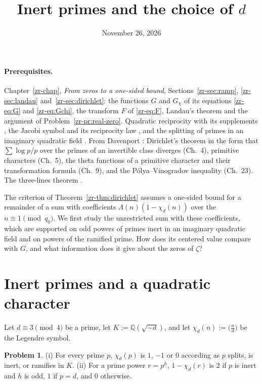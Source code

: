 \documentclass[reqno]{amsart}
\title{Inert primes and the choice of \(d\)}
\author{}
\date{November 26, 2026}
\newcounter{chap}
\theoremstyle{definition}
\newtheorem{problem}{Problem}[section]
\theoremstyle{plain}
\theoremstyle{remark}
\newcommand{\Q}{\mathbb{Q}}
\begin{document}
\maketitle
{}\label{chap}


\paragraph{Prerequisites.}
Chapter~\ref{zr-chap}, \emph{From zeros to a one-sided bound}, Sections~\ref{zr-sec:ramp}, \ref{zr-sec:landau} and~\ref{zr-sec:dirichlet}: the functions $G$ and $G_\chi$ of its equations \eqref{zr-eq:G} and \eqref{zr-eq:Gchi}, the transform $F$ of \eqref{zr-eq:F}, Landau's theorem and the argument of Problem~\ref{zr-pr:real-zero}.  Quadratic reciprocity with its supplements \cite[Ch.~I, \S3]{SeA}, the Jacobi symbol and its reciprocity law \cite[Ch.~5]{IR}, and the splitting of primes in an imaginary quadratic field \cite[Ch.~I, \S8]{Ne}.  From Davenport \cite{Dav}: Dirichlet's theorem in the form that $\sum \log p/p$ over the primes of an invertible class diverges (Ch.~4), primitive characters (Ch.~5), the theta functions of a primitive character and their transformation formula (Ch.~9), and the P\'olya--Vinogradov inequality (Ch.~23).  The three-lines theorem \cite[Ch.~12]{Ru}. %

\medskip
The criterion of Theorem~\ref{zr-thm:dirichlet} assumes a one-sided bound for a remainder of a sum with coefficients $\Lambda(n)(1 - \chi_d(n))$ over the $n \equiv 1 \pmod{q_0}$.  We first study the unrestricted sum with these coefficients, which are supported on odd powers of primes inert in an imaginary quadratic field and on powers of the ramified prime.  How does its centered value compare with $G$, and what information does it give about the zeros of $\zeta$?

\section{Inert primes and a quadratic character}\label{sec:inert}

Let $d \equiv 3 \pmod 4$ be a prime, let $K := \Q(\sqrt{-d})$, and let $\chi_d(n) := \bigl(\frac{n}{d}\bigr)$ be the Legendre symbol.

\begin{problem}\label{pr:kronecker}
(i) For every prime $p$, $\chi_d(p)$ is $1$, $-1$ or $0$ according as $p$ splits, is inert, or ramifies in $K$.
(ii) For a prime power $r = p^h$, $1 - \chi_d(r)$ is $2$ if $p$ is inert and $h$ is odd, $1$ if $p = d$, and $0$ otherwise.
\end{problem}
\end{document}

